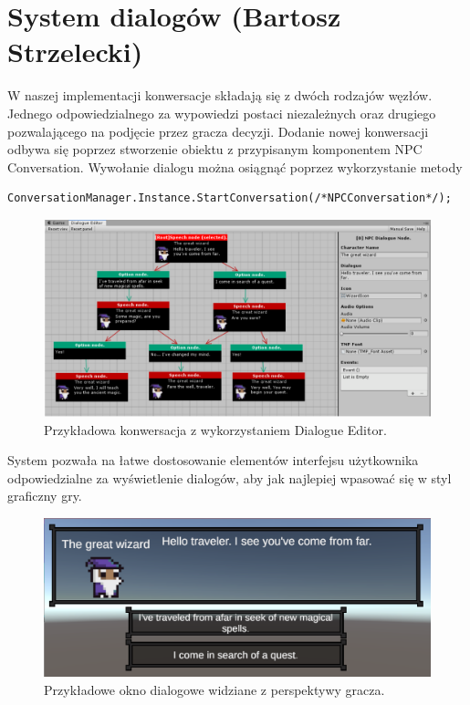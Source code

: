 \section{System dialogów (Bartosz Strzelecki)}\label{s:dia_impl}

W naszej implementacji konwersacje składają się z dwóch rodzajów węzłów. Jednego odpowiedzialnego za wypowiedzi postaci niezależnych oraz drugiego
pozwalającego na podjęcie przez gracza decyzji.
Dodanie nowej konwersacji odbywa się poprzez stworzenie obiektu z przypisanym komponentem NPC Conversation.
Wywołanie dialogu można osiągnąć poprzez wykorzystanie metody


\begin{verbatim}
ConversationManager.Instance.StartConversation(/*NPCConversation*/);
\end{verbatim}

\begin{figure}[h]
\centering
\includegraphics[width=1\textwidth]{images/dial}
\caption{Przykładowa konwersacja z wykorzystaniem Dialogue Editor.}
\end{figure}
System pozwała na łatwe dostosowanie elementów interfejsu użytkownika odpowiedzialne za wyświetlenie dialogów, aby jak najlepiej wpasować się
w styl graficzny gry.

\begin{figure}[h]
\centering
\includegraphics[width=1\textwidth]{images/d}
\caption{Przykładowe okno dialogowe widziane z perspektywy gracza.}
\end{figure}
